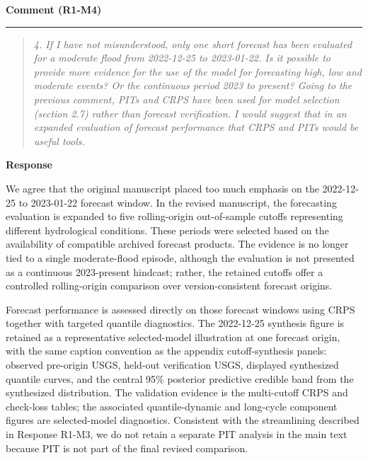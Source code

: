 \documentclass[11pt,letterpaper]{article}
\newcommand{\commentheading}[1]{%
  \vspace{6pt}\noindent\textbf{Comment (#1)}\par
  \vspace{2pt}\hrule\vspace{6pt}
}
\newenvironment{commentblock}{\begin{quote}\small\itshape}{\end{quote}}
\newcommand{\responseheading}{%
  \vspace{2pt}\noindent\textbf{Response}\par
}
\newenvironment{responsebox}{\begin{mdframed}[style=plainbox]}{\end{mdframed}}
\newcommand{\RoneM}[1]{R1-M#1}
\begin{document}
\commentheading{\RoneM{4}}
\begin{commentblock}
4. If I have not misunderstood, only one short forecast has been evaluated for a moderate flood from 2022-12-25 to 2023-01-22. Is it possible to provide more evidence for the use of the model for forecasting high, low and moderate events? Or the continuous period 2023 to present? Going to the previous comment, PITs and CRPS have been used for model selection (section 2.7) rather than forecast verification. I would suggest that in an expanded evaluation of forecast performance that CRPS and PITs would be useful tools.
\end{commentblock}
\responseheading
\begin{responsebox}
We agree that the original manuscript placed too much emphasis on the 2022-12-25 to 2023-01-22 forecast window. In the revised manuscript, the forecasting evaluation is expanded to five rolling-origin out-of-sample cutoffs representing different hydrological conditions. These periods were selected based on the availability of compatible archived forecast products. The evidence is no longer tied to a single moderate-flood episode, although the evaluation is not presented as a continuous 2023-present hindcast; rather, the retained cutoffs offer a controlled rolling-origin comparison over version-consistent forecast origins.

Forecast performance is assessed directly on those forecast windows using CRPS together with targeted quantile diagnostics. The 2022-12-25 synthesis figure is retained as a representative selected-model illustration at one forecast origin, with the same caption convention as the appendix cutoff-synthesis panels: observed pre-origin USGS, held-out verification USGS, displayed synthesized quantile curves, and the central 95\% posterior predictive credible band from the synthesized distribution. The validation evidence is the multi-cutoff CRPS and check-loss tables; the associated quantile-dynamic and long-cycle component figures are selected-model diagnostics. Consistent with the streamlining described in Response R1-M3, we do not retain a separate PIT analysis in the main text because PIT is not part of the final revised comparison.
\end{responsebox}
\end{document}
